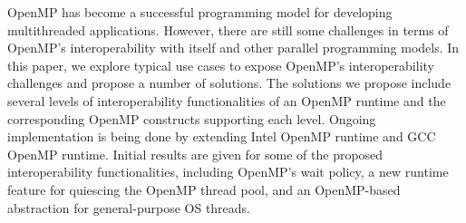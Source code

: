 OpenMP has become a successful programming model
for developing multithreaded applications.
However, there are still some challenges in terms of OpenMP's interoperability
with itself and other parallel programming models.
In this paper, we explore typical use cases to expose OpenMP's interoperability challenges and
propose a number of solutions.
The solutions we propose include several levels of interoperability functionalities of an OpenMP runtime and
the corresponding OpenMP constructs supporting each level.
Ongoing implementation is being done by extending Intel OpenMP runtime and GCC OpenMP runtime.
Initial results are given for some of the proposed interoperability functionalities, including OpenMP's wait policy,
a new runtime feature for quiescing the OpenMP thread pool,
and an OpenMP-based abstraction for general-purpose OS threads.
